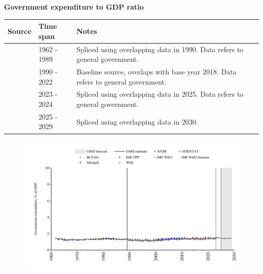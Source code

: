 \documentclass[12pt,a4paper,landscape]{article}
\begin{document}
\begin{adjustbox}{max totalsize={\paperwidth}{\paperheight},center}
\begin{minipage}[t][\textheight][t]{\textwidth}
\vspace*{0.5cm}
{}
\begin{center}
{\Large\bfseries Government expenditure to GDP ratio}
\end{center}
\vspace{0.5cm}
\begin{table}[H]
\centering
\small
\begin{tabular}{|l|l|l|}
\hline
\textbf{Source} & \textbf{Time span} & \textbf{Notes} \\
\hline
\rowcolor{white}\cite{BCEAO}& 1962 - 1989 &Spliced using overlapping data in 1990. Data refers to general government.\\
\rowcolor{lightgray}\cite{AFRISTAT}& 1990 - 2022 &Baseline source, overlaps with base year 2018. Data refers to general government.\\
\rowcolor{white}\cite{BCEAO}& 2023 - 2024 &Spliced using overlapping data in 2025. Data refers to general government.\\
\rowcolor{lightgray}\cite{IMF_WEO_forecast}& 2025 - 2029 &Spliced using overlapping data in 2030. \\
\hline
\end{tabular}
\end{table}
\begin{figure}[H]
\centering
\includegraphics[width=\textwidth,height=0.6\textheight,keepaspectratio]{graphs/SEN_govexp_GDP.pdf}
\end{figure}
\end{minipage}
\end{adjustbox}
\end{document}
